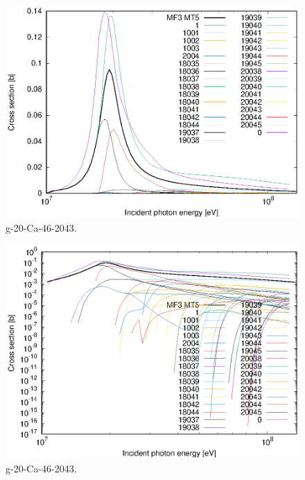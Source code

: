 \begin{figure}
 \includegraphics[width=\linewidth]{eps/g_20-Ca-46_2043.eps}
  \caption{g-20-Ca-46-2043.}
\end{figure}
\begin{figure}
 \includegraphics[width=\linewidth]{eps-log/g_20-Ca-46_2043.eps}
 \caption{g-20-Ca-46-2043.}
\end{figure}
\newpage \clearpage

